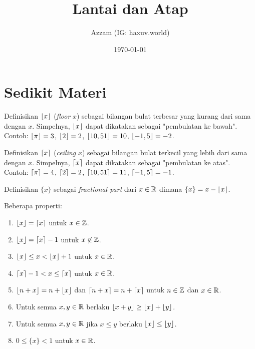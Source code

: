 \documentclass[11pt]{scrartcl}
\title{Lantai dan Atap}
\author{Azzam (IG: haxuv.world)}
\date{\today}
\begin{document}
\maketitle
\section{Sedikit Materi}
Definisikan $\left\lfloor x \right\rfloor$ (\textit{floor} $x$) sebagai bilangan bulat terbesar yang kurang dari sama dengan $x$. Simpelnya, $\left\lfloor x \right\rfloor$ dapat dikatakan sebagai "pembulatan ke bawah". Contoh: $\left\lfloor \pi \right\rfloor=3$, $\left\lfloor 2 \right\rfloor=2$, $\left\lfloor 10,51 \right\rfloor=10$, $\left\lfloor -1,5 \right\rfloor=-2$.

Definisikan $\left\lceil x \right\rceil$ (\textit{ceiling} $x$) sebagai bilangan bulat terkecil yang lebih dari sama dengan $x$. Simpelnya, $\left\lceil x \right\rceil$ dapat dikatakan sebagai "pembulatan ke atas". Contoh: $\left\lceil \pi \right\rceil=4$, $\left\lceil 2 \right\rceil=2$, $\left\lceil 10,51 \right\rceil=11$, $\left\lceil -1,5 \right\rceil=-1$.

Definisikan $\{x\}$ sebagai \textit{fractional part} dari $x \in \mathbb R$ dimana $\{x\} = x - \left\lfloor x \right\rfloor$.

Beberapa properti:
\begin{enumerate}
    \item $\left\lfloor x \right\rfloor=\left\lceil x \right\rceil$ untuk $x \in \mathbb Z$.
    \item $\left\lfloor x \right\rfloor=\left\lceil x \right\rceil-1$ untuk $x \not \in \mathbb Z$.
    \item $\left\lfloor x \right\rfloor \le  x < \left\lfloor x \right\rfloor+1$ untuk $x \in \mathbb R$.
    \item $\left\lceil x \right\rceil-1 < x \le \left\lceil x \right\rceil$ untuk $x \in \mathbb R$.
    \item $\left\lfloor n+x \right\rfloor=n+\left\lfloor x \right\rfloor$ dan $\left\lceil n+x \right\rceil=n+\left\lceil x \right\rceil$ untuk $n\in \mathbb Z$ dan $x \in \mathbb R$.
    \item Untuk semua $x,y \in \mathbb R$ berlaku $\left\lfloor x+y \right\rfloor \ge \left\lfloor x \right\rfloor+\left\lfloor y \right\rfloor$.
    \item Untuk semua $x,y \in \mathbb R$ jika $x \le y$ berlaku $\left\lfloor x \right\rfloor \le \left\lfloor y \right\rfloor$.
    \item $0 \le \{x\} < 1$ untuk $x \in \mathbb R$.
\end{enumerate}
\end{document}
